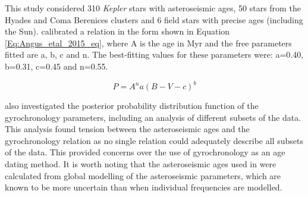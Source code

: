 This study considered 310 \textit{Kepler} stars with asteroseismic ages, 50 stars from the Hyades and Coma Berenices clusters and 6 field stars with precise ages (including the Sun). \citet{Angus_etal_2015} calibrated a relation in the form shown in Equation \ref{Eq:Angus_etal_2015_eq}, where A is the age in Myr and the free parameters fitted are a, b, c and n. The best-fitting values for these parameters were: a=0.40, b=0.31, c=0.45 and n=0.55.

\begin{equation}
    P = A^{n}a(B - V - c)^{b}
    \label{Eq:Angus_etal_2015_eq}
\end{equation}

\citet{Angus_etal_2015} also investigated the posterior probability distribution function of the gyrochronology parameters, including an analysis of different subsets of the data. This analysis found tension between the asteroseismic ages and the gyrochronology relation as no single relation could adequately describe all subsets of the data. This provided concerns over the use of gyrochronology as an age dating method. It is worth noting that the asteroseismic ages used in \citet{Angus_etal_2015} were calculated from global modelling of the asteroseismic parameters, which are known to be more uncertain than when individual frequencies are modelled.

